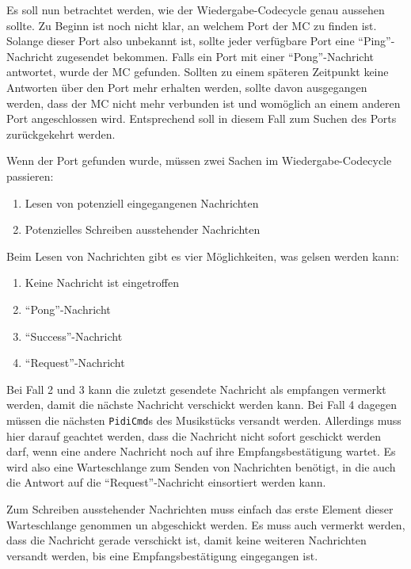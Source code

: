 Es soll nun betrachtet werden, wie der Wiedergabe-Codecycle genau aussehen sollte. \newline
Zu Beginn ist noch nicht klar, an welchem Port der \ac{MC} zu finden ist.
Solange dieser Port also unbekannt ist, sollte jeder verfügbare Port eine \enquote{Ping}-Nachricht zugesendet bekommen.
Falls ein Port mit einer \enquote{Pong}-Nachricht antwortet, wurde der \ac{MC} gefunden.
Sollten zu einem späteren Zeitpunkt keine Antworten über den Port mehr erhalten werden, sollte davon ausgegangen werden, dass der \ac{MC} nicht mehr verbunden ist und womöglich an einem anderen Port angeschlossen wird.
Entsprechend soll in diesem Fall zum Suchen des Ports zurückgekehrt werden.

Wenn der Port gefunden wurde, müssen zwei Sachen im Wiedergabe-Codecycle passieren:
\begin{enumerate}
    \item Lesen von potenziell eingegangenen Nachrichten
    \item Potenzielles Schreiben ausstehender Nachrichten
\end{enumerate}

Beim Lesen von Nachrichten gibt es vier Möglichkeiten, was gelsen werden kann:
\begin{enumerate}
    \item Keine Nachricht ist eingetroffen
    \item \enquote{Pong}-Nachricht
    \item \enquote{Success}-Nachricht
    \item \enquote{Request}-Nachricht
\end{enumerate}

Bei Fall 2 und 3 kann die zuletzt gesendete Nachricht als empfangen vermerkt werden, damit die nächste Nachricht verschickt werden kann.
Bei Fall 4 dagegen müssen die nächsten \lstinline|PidiCmd|s des Musikstücks versandt werden.
Allerdings muss hier darauf geachtet werden, dass die Nachricht nicht sofort geschickt werden darf, wenn eine andere Nachricht noch auf ihre Empfangsbestätigung wartet.
Es wird also eine Warteschlange zum Senden von Nachrichten benötigt, in die auch die Antwort auf die \enquote{Request}-Nachricht einsortiert werden kann.

Zum Schreiben ausstehender Nachrichten muss einfach das erste Element dieser Warteschlange genommen un abgeschickt werden.
Es muss auch vermerkt werden, dass die Nachricht gerade verschickt ist, damit keine weiteren Nachrichten versandt werden, bis eine Empfangsbestätigung eingegangen ist.

